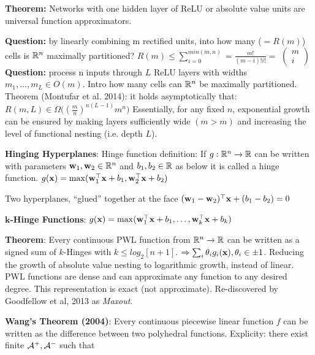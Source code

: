         \textbf{Theorem:} Networks with one hidden layer of ReLU or absolute value units are universal function approximators.
        
        \textbf{Question:} by linearly combining m rectified units, into how many ($=R(m)$) cells is $\mathbb R^n$ maximally partitioned?
        $R(m)\leq \sum_{i=0}^{min(m,n)}=\frac{m!}{(m-i)!i!}=$
        \(
          \begin{pmatrix}
            m\\
            i
          \end{pmatrix}
        \)
        \textbf{Question:} process n inputs through $L$ ReLU layers with widths $m_1,...,m_L\in O(m)$. Intro how many cells can $\mathbb R^n$ be maximally partitioned. Theorem (Montufar et al. 2014): it holds asymptotically that: $R(m,L)\in\Omega\big((\frac{m}{n})^{n(L-1)} m^{n}\big)$
        Essentially, for any fixed $n$, exponential growth can be ensured by making layers sufficiently wide $(m>m)$ and increasing the level of functional nesting (i.e. depth $L$).
        
        \textbf{Hinging Hyperplanes}: Hinge function definition:
        If $g:\mathbb R^n\xrightarrow{}\mathbb R$ can be written with parameters $\mathbf w_1,\mathbf w_2\in\mathbb R^n$ and $b_1,b_2\in\mathbb R$ as below it is called a hinge function.
        \tab$g(\mathbf x)=\max(\mathbf w_1^{\mathop{\mathrm{\top}}}\mathbf x+b_1,\mathbf w_2^{\mathop{\mathrm{\top}}}\mathbf x+b_2)$
        
        Two hyperplanes, ``glued'' together at the face $(\mathbf w_1-\mathbf w_2)^{\mathop{\mathrm{\top}}}\mathbf x+(b_1-b_2)=0$
        
        \textbf{$\mathbf{k}$-Hinge Functions}: \tab$g(\mathbf x)=\max(\mathbf w_1^{\mathop{\mathrm{\top}}}\mathbf x+b_1,\ldots,\mathbf w_k^{\mathop{\mathrm{\top}}}\mathbf x+b_k)$
        
        \textbf{Theorem}: Every continuous PWL function from $\mathbb R^n\xrightarrow{}\mathbb R$ can be written as a signed sum of $k$-Hinges with $k\leq log_2[n+1]$. 
        $\Rightarrow \sum_i\theta_ig_i(\mathbf x), \theta_i\in {\pm 1}$. Reducing the growth of absolute value nesting to logarithmic growth, instead of linear. PWL functions are dense and can approximate any function to any desired degree.
        This representation is exact (not approximate). Re-discovered by Goodfellow et al, 2013 as \emph{Maxout}.
        
        
        
        \textbf{Wang's Theorem (2004)}: Every continuous piecewise linear function $f$ can be written as the difference between two polyhedral functions. Explicity: there exist finite $\mathcal{A}^+,\mathcal{A}^-$ such that
        

